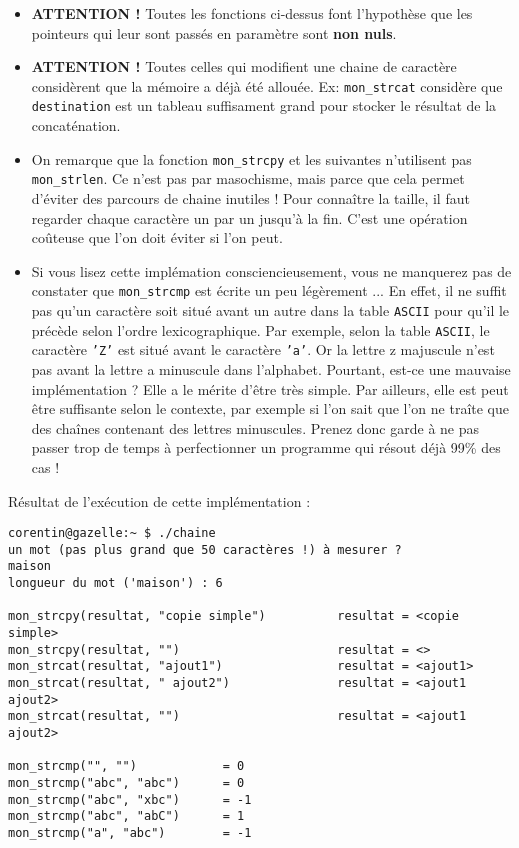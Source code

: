 \documentclass[10pt]{article}
\begin{document}
\begin{itemize}
\item \textbf{ATTENTION !} Toutes les fonctions ci-dessus font l'hypothèse que les
  pointeurs qui leur sont passés en paramètre sont \textbf{non nuls}.
\item \textbf{ATTENTION !} Toutes celles qui modifient une chaine de
  caractère considèrent que la mémoire a déjà été allouée. Ex:
  \texttt{mon\_strcat} considère que \texttt{destination} est un
  tableau suffisament grand pour stocker le résultat de la
  concaténation.
\item On remarque que la fonction \texttt{mon\_strcpy} et les
  suivantes n'utilisent pas \texttt{mon\_strlen}. Ce n'est pas par
  masochisme, mais parce que cela permet d'éviter des parcours de
  chaine inutiles ! Pour connaître la taille, il faut regarder chaque
  caractère un par un jusqu'à la fin. C'est une opération coûteuse que
  l'on doit éviter si l'on peut.
\item Si vous lisez cette implémation consciencieusement, vous ne
  manquerez pas de constater que \texttt{mon\_strcmp} est écrite un
  peu légèrement ... En effet, il ne suffit pas qu'un caractère soit
  situé avant un autre dans la table \texttt{ASCII} pour qu'il le
  précède selon l'ordre lexicographique. Par exemple, selon la table
  \texttt{ASCII}, le caractère \texttt{'Z'} est situé avant le
  caractère \texttt{'a'}. Or la lettre z majuscule n'est pas avant la
  lettre a minuscule dans l'alphabet. Pourtant, est-ce une mauvaise
  implémentation ? Elle a le mérite d'être très simple. Par ailleurs,
  elle est peut être suffisante selon le contexte, par exemple si l'on
  sait que l'on ne traîte que des chaînes contenant des lettres
  minuscules. Prenez donc garde à ne pas passer trop de temps à
  perfectionner un programme qui résout déjà 99\% des cas !
\end{itemize}

\vspace{0.5cm}



\vspace{0.5cm}

Résultat de l'exécution de cette implémentation :

\vspace{0.5cm}

\begin{verbatim}
corentin@gazelle:~ $ ./chaine
un mot (pas plus grand que 50 caractères !) à mesurer ?
maison
longueur du mot ('maison') : 6

mon_strcpy(resultat, "copie simple")          resultat = <copie simple>
mon_strcpy(resultat, "")                      resultat = <>
mon_strcat(resultat, "ajout1")                resultat = <ajout1>
mon_strcat(resultat, " ajout2")               resultat = <ajout1 ajout2>
mon_strcat(resultat, "")                      resultat = <ajout1 ajout2>

mon_strcmp("", "")            = 0
mon_strcmp("abc", "abc")      = 0
mon_strcmp("abc", "xbc")      = -1
mon_strcmp("abc", "abC")      = 1
mon_strcmp("a", "abc")        = -1
\end{verbatim}
\end{document}
